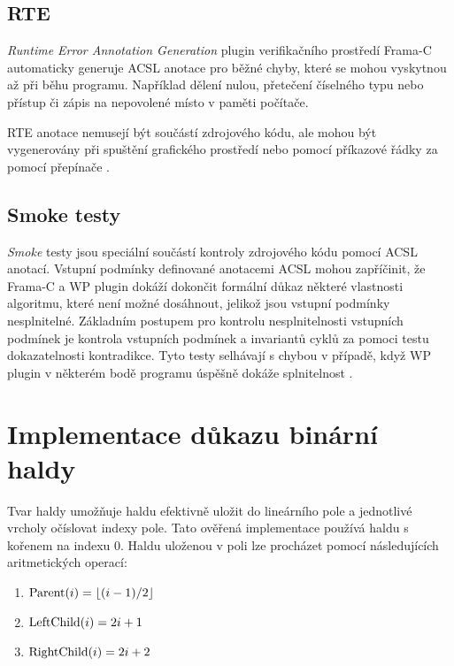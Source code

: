 \section{RTE}

\textit{Runtime Error Annotation Generation} plugin verifikačního prostředí Frama-C automaticky generuje ACSL anotace pro běžné chyby, které se mohou vyskytnou až při běhu programu. Například dělení nulou, přetečení číselného typu nebo přístup či zápis na nepovolené místo v paměti počítače. \cite{FramaC24RTEManual}

RTE anotace nemusejí být součástí zdrojového kódu, ale mohou být vygenerovány při spuštění grafického prostředí nebo pomocí příkazové řádky za pomocí přepínače .


\section{Smoke testy}

\textit{Smoke} testy jsou speciální součástí kontroly zdrojového kódu pomocí ACSL anotací. Vstupní podmínky definované anotacemi ACSL mohou zapříčinit, že Frama-C a WP plugin dokáží dokončit formální důkaz některé vlastnosti algoritmu, které není možné dosáhnout, jelikož jsou vstupní podmínky nesplnitelné. Základním postupem pro kontrolu nesplnitelnosti vstupních podmínek je kontrola vstupních podmínek a invariantů cyklů za pomoci testu dokazatelnosti kontradikce. Tyto testy selhávají s chybou v případě, když WP plugin v některém bodě programu úspěšně dokáže splnitelnost . \cite{FramaC24WPManual}


\chapter{Implementace důkazu binární haldy}

Tvar haldy umožňuje haldu efektivně uložit do lineárního pole a jednotlivé vrcholy očíslovat indexy pole. Tato ověřená implementace používá haldu s kořenem na indexu $0$. Haldu uloženou v poli lze procházet pomocí následujících aritmetických operací:

\begin{enumerate}
	\item[] $\operatorname{Parent}(i) = \lfloor (i - 1) / 2 \rfloor$
	\item[] $\operatorname{LeftChild}(i) = 2i + 1$
	\item[] $\operatorname{RightChild}(i) = 2i + 2$
\end{enumerate}

